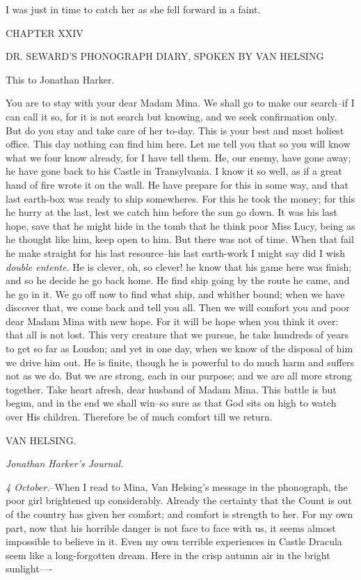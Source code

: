 \documentclass[12pt,openright]{book}
\begin{document}
I was just in time to catch her as she fell forward in a faint.

CHAPTER XXIV

DR. SEWARD’S PHONOGRAPH DIARY, SPOKEN BY VAN HELSING

This to Jonathan Harker.

You are to stay with your dear Madam Mina. We shall go to make our search–if I can call it so, for it is not search but knowing, and we seek confirmation only. But do you stay and take care of her to-day. This is your best and most holiest office. This day nothing can find him here. Let me tell you that so you will know what we four know already, for I have tell them. He, our enemy, have gone away; he have gone back to his Castle in Transylvania. I know it so well, as if a great hand of fire wrote it on the wall. He have prepare for this in some way, and that last earth-box was ready to ship somewheres. For this he took the money; for this he hurry at the last, lest we catch him before the sun go down. It was his last hope, save that he might hide in the tomb that he think poor Miss Lucy, being as he thought like him, keep open to him. But there was not of time. When that fail he make straight for his last resource–his last earth-work I might say did I wish \textit{double entente}. He is clever, oh, so clever! he know that his game here was finish; and so he decide he go back home. He find ship going by the route he came, and he go in it. We go off now to find what ship, and whither bound; when we have discover that, we come back and tell you all. Then we will comfort you and poor dear Madam Mina with new hope. For it will be hope when you think it over: that all is not lost. This very creature that we pursue, he take hundreds of years to get so far as London; and yet in one day, when we know of the disposal of him we drive him out. He is finite, though he is powerful to do much harm and suffers not as we do. But we are strong, each in our purpose; and we are all more strong together. Take heart afresh, dear husband of Madam Mina. This battle is but begun, and in the end we shall win–so sure as that God sits on high to watch over His children. Therefore be of much comfort till we return.

VAN HELSING.

\textit{Jonathan Harker’s Journal.}

\textit{4 October.}–When I read to Mina, Van Helsing’s message in the phonograph, the poor girl brightened up considerably. Already the certainty that the Count is out of the country has given her comfort; and comfort is strength to her. For my own part, now that his horrible danger is not face to face with us, it seems almost impossible to believe in it. Even my own terrible experiences in Castle Dracula seem like a long-forgotten dream. Here in the crisp autumn air in the bright sunlight—-
\end{document}
